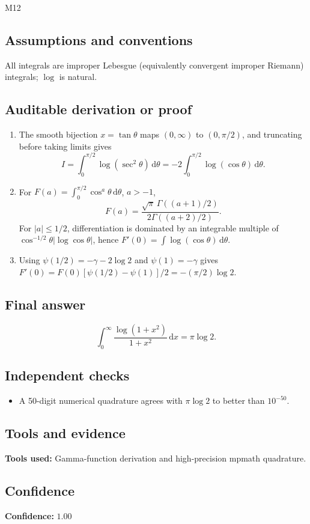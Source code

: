 \documentclass[11pt]{article}
\newcommand{\dd}{\mathrm{d}}
\begin{document}
\begin{mprsolution}{M12}
\subsection*{Assumptions and conventions}
All integrals are improper Lebesgue (equivalently convergent improper Riemann)
integrals; \(\log\) is natural.
\subsection*{Auditable derivation or proof}
\begin{enumerate}[label=\textbf{Step \arabic*:},leftmargin=*]
\item The smooth bijection \(x=\tan\theta\) maps \((0,\infty)\) to
\((0,\pi/2)\), and truncating before taking limits gives
\[
I=\int_0^{\pi/2}\log(\sec^2\theta)\,\dd\theta
=-2\int_0^{\pi/2}\log(\cos\theta)\,\dd\theta .
\]
\item For \(F(a)=\int_0^{\pi/2}\cos^a\theta\,\dd\theta\), \(a>-1\),
\[
F(a)=\frac{\sqrt\pi\,\Gamma((a+1)/2)}{2\Gamma((a+2)/2)}.
\]
For \(|a|\le1/2\), differentiation is dominated by an integrable multiple of
\(\cos^{-1/2}\theta|\log\cos\theta|\), hence
\(F'(0)=\int\log(\cos\theta)\,\dd\theta\).
\item Using \(\psi(1/2)=-\gamma-2\log2\) and \(\psi(1)=-\gamma\) gives
\(F'(0)=F(0)[\psi(1/2)-\psi(1)]/2=-(\pi/2)\log2\).
\end{enumerate}
\subsection*{Final answer}
\[
\boxed{\displaystyle \int_0^\infty\frac{\log(1+x^2)}{1+x^2}\,\dd x
=\pi\log2.}
\]
\subsection*{Independent checks}
\begin{itemize}[leftmargin=*]
\item A 50-digit numerical quadrature agrees with \(\pi\log2\) to better than
\(10^{-50}\).
\end{itemize}
\subsection*{Tools and evidence}
\textbf{Tools used:} Gamma-function derivation and high-precision mpmath
quadrature.
\subsection*{Confidence}
\textbf{Confidence:} \(1.00\)
\end{mprsolution}
\end{document}
